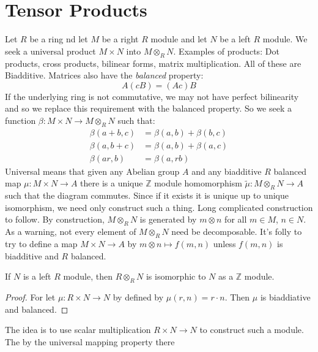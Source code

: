 \section{Tensor Products}
    Let $R$ be a ring nd let $M$ be a right $R$ module and let $N$ be a
    left $R$ module. We seek a universal product $M\times{N}$ into
    $M\otimes_{R}N$. Examples of products: Dot products, cross products,
    bilinear forms, matrix multiplication. All of these are Biadditive.
    Matrices also have the \textit{balanced} property:
    \begin{equation}
        A(cB)=(Ac)B
    \end{equation}
    If the underlying ring is not commutative, we may not have perfect
    bilinearity and so we replace this requirement with the balanced
    property. So we seek a function
    $\beta:M\times{N}\rightarrow{M}\otimes_{R}N$ such that:
    \begin{align}
        \beta(a+b,c)&=\beta(a,b)+\beta(b,c)\tag{Left Additivity}\\
        \beta(a,b+c)&=\beta(a,b)+\beta(a,c)\tag{Right Additivity}\\
        \beta(ar,b)&=\beta(a,rb)\tag{Balanced}
    \end{align}
    Universal means that given any Abelian group $A$ and any biadditive
    $R$ balanced map $\mu:M\times{N}\rightarrow{A}$ there is a unique
    $\mathbb{Z}$ module homomorphism
    $\tilde{\mu}:M\otimes_{R}N\rightarrow{A}$ such that the diagram
    commutes. Since if it exists it is unique up to unique isomorphism, we
    need only construct such a thing. Long complicated construction to
    follow. By construction, $M\otimes_{R}N$ is generated by $m\otimes{n}$
    for all $m\in{M}$, $n\in{N}$. As a warning, not every element of
    $M\otimes_{R}N$ need be decomposable. It's folly to try to define a map
    $M\times{N}\rightarrow{A}$ by $m\otimes{n}\mapsto{f}(m,n)$ unless
    $f(m,n)$ is biadditive and $R$ balanced.
    \begin{theorem}
        If $N$ is a left $R$ module, then $R\otimes_{R}N$ is isomorphic to
        $N$ as a $\mathbb{Z}$ module.
    \end{theorem}
    \begin{proof}
        For let $\mu:R\times{N}\rightarrow{N}$ by defined by
        $\mu(r,n)=r\cdot{n}$. Then $\mu$ is biaddiative and balanced.
    \end{proof}
    The idea is to use scalar multiplication $R\times{N}\rightarrow{N}$ to
    construct such a module. The by the universal mapping property there
